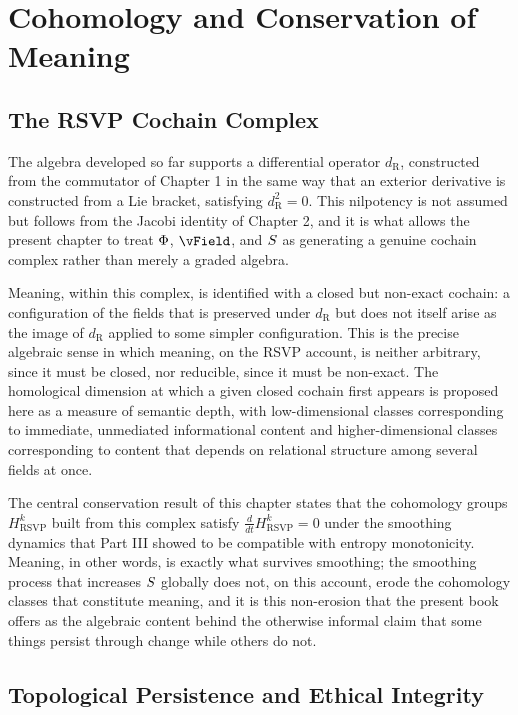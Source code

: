 \part{Cohomology and Conservation of Meaning}

\chapter{The RSVP Cochain Complex}

The algebra developed so far supports a differential operator $d_{\mathrm{R}}$, constructed from the commutator of Chapter 1 in the same way that an exterior derivative is constructed from a Lie bracket, satisfying $d_{\mathrm{R}}^2 = 0$. This nilpotency is not assumed but follows from the Jacobi identity of Chapter 2, and it is what allows the present chapter to treat $\Phi$, $\vField$, and $S$ as generating a genuine cochain complex rather than merely a graded algebra.

Meaning, within this complex, is identified with a closed but non-exact cochain: a configuration of the fields that is preserved under $d_{\mathrm{R}}$ but does not itself arise as the image of $d_{\mathrm{R}}$ applied to some simpler configuration. This is the precise algebraic sense in which meaning, on the RSVP account, is neither arbitrary, since it must be closed, nor reducible, since it must be non-exact. The homological dimension at which a given closed cochain first appears is proposed here as a measure of semantic depth, with low-dimensional classes corresponding to immediate, unmediated informational content and higher-dimensional classes corresponding to content that depends on relational structure among several fields at once.

The central conservation result of this chapter states that the cohomology groups $H^k_{\mathrm{RSVP}}$ built from this complex satisfy $\frac{d}{dt} H^k_{\mathrm{RSVP}} = 0$ under the smoothing dynamics that Part III showed to be compatible with entropy monotonicity. Meaning, in other words, is exactly what survives smoothing; the smoothing process that increases $S$ globally does not, on this account, erode the cohomology classes that constitute meaning, and it is this non-erosion that the present book offers as the algebraic content behind the otherwise informal claim that some things persist through change while others do not.

\chapter{Topological Persistence and Ethical Integrity}

